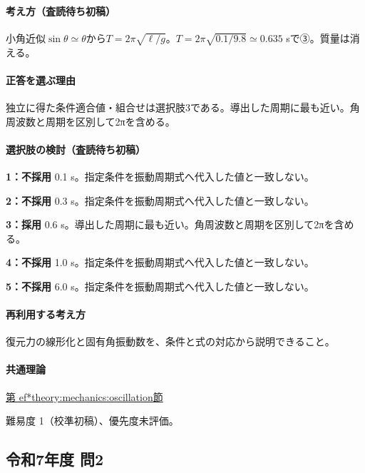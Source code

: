 \paragraph{考え方（査読待ち初稿）} 小角近似\(\sin\theta\simeq\theta\)から\(T=2\pi\sqrt{\ell/g}\)。\(T=2\pi\sqrt{0.1/9.8}\simeq0.635\) sで③。質量は消える。

\paragraph{正答を選ぶ理由} 独立に得た条件適合値・組合せは選択肢3である。導出した周期に最も近い。角周波数と周期を区別して2πを含める。

\paragraph{選択肢の検討（査読待ち初稿）}

\noindent\textbf{1：不採用} 0.1 s。指定条件を振動周期式へ代入した値と一致しない。\par

\noindent\textbf{2：不採用} 0.3 s。指定条件を振動周期式へ代入した値と一致しない。\par

\noindent\textbf{3：採用} 0.6 s。導出した周期に最も近い。角周波数と周期を区別して2πを含める。\par

\noindent\textbf{4：不採用} 1.0 s。指定条件を振動周期式へ代入した値と一致しない。\par

\noindent\textbf{5：不採用} 6.0 s。指定条件を振動周期式へ代入した値と一致しない。\par

\paragraph{再利用する考え方} 復元力の線形化と固有角振動数を、条件と式の対応から説明できること。

\paragraph{共通理論} \hyperref[theory:mechanics:oscillation]{第
ef*{theory:mechanics:oscillation}節}

\par 難易度 1（校準初稿）、優先度未評価。

\subsection{令和7年度 問2}
\label{q:r07-reg-applied-02}

